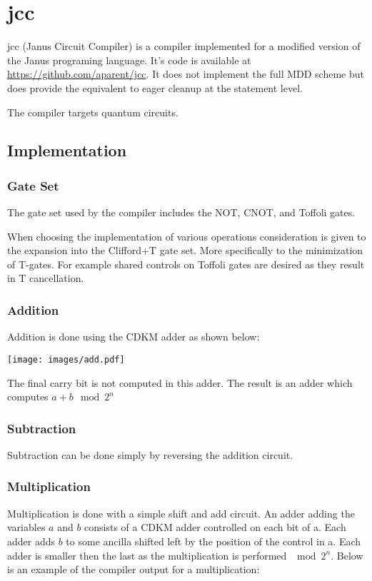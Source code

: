 \chapter{jcc}

jcc (Janus Circuit Compiler) is a compiler implemented for a modified version
of the Janus programing language\cite{YG:2007}.  It's code is available at
\url{https://github.com/aparent/jcc}.  It does not implement the full MDD
scheme but does provide the equivalent to eager cleanup at the statement level.

The compiler targets quantum circuits.

\section{Implementation}
\subsection{Gate Set}

The gate set used by the compiler includes the NOT, CNOT, and Toffoli gates.

When choosing the implementation of various operations consideration is given to the expansion into the Clifford+T gate set. More specifically to the minimization of T-gates. For example shared controls on Toffoli gates are desired as they result in T cancellation.

\subsection{Addition}
Addition is done using the CDKM\cite{CDKM:2004} adder as shown below:


\texttt{[image: images/add.pdf]}

The final carry bit is not computed in this adder.
The result is an adder which computes $a+b \mod 2^n$

\subsection{Subtraction}
Subtraction can be done simply by reversing the addition circuit.

\subsection{Multiplication}
Multiplication is done with a simple shift and add circuit.
An adder adding the variables $a$ and $b$ consists of a CDKM\cite{CDKM:2004} adder controlled on each bit of a.
Each adder adds $b$ to some ancilla shifted left by the position of the control in a.
Each adder is smaller then the last as the multiplication is performed $\mod 2^n$.
Below is an example of the compiler output for a multiplication:

